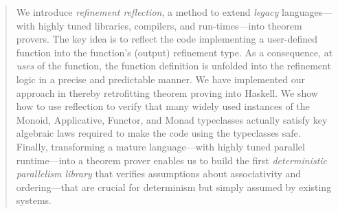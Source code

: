 
\begin{abstract}
We introduce \emph{refinement reflection}, a method
to extend \emph{legacy} languages---with highly tuned
libraries, compilers, and run-times---into theorem provers.
%
The key idea is to reflect the code implementing a
user-defined function into the function's (output)
refinement type.
%
As a consequence, at \emph{uses} of the function,
the function definition is unfolded into the refinement logic
in a precise and predictable manner.
%
We have implemented our approach in \toolname
thereby retrofitting theorem proving into Haskell.
%
We show how to use reflection to verify
that many widely used instances of the Monoid,
Applicative, Functor, and Monad typeclasses
actually satisfy key algebraic laws required to 
make the code using the typeclasses safe.
%
Finally, transforming a mature language---with
highly tuned parallel runtime---into a theorem
prover  enables us to build the first
\emph{deterministic parallelism library}
that verifies assumptions about associativity
and ordering---that are crucial for determinism
but simply assumed by existing systems.
\end{abstract}


